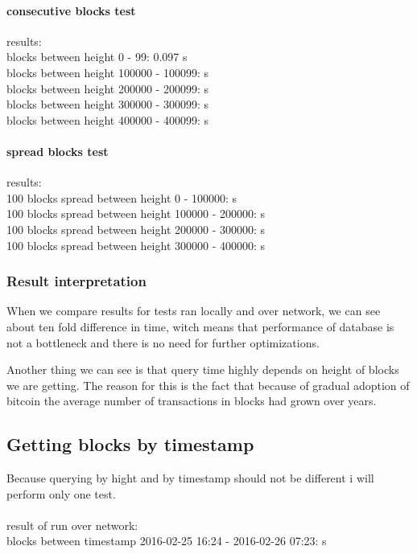 \documentclass[12pt, en, eng]{mgr}
\begin{document}
\paragraph{consecutive blocks test}
results:
\\
blocks between height 0 - 99: \quad \quad \quad \hspace*{2em} 0.097 s\\
blocks between height 100000 - 100099:  s\\
blocks between height 200000 - 200099:  s\\
blocks between height 300000 - 300099:  s\\
blocks between height 400000 - 400099:  s\\

\paragraph{spread blocks test}
results:
\\
100 blocks spread between height 0 - 100000: \quad \quad {} s\\
100 blocks spread between height 100000 - 200000:  s\\
100 blocks spread between height 200000 - 300000:  s\\
100 blocks spread between height 300000 - 400000:  s\\

\subsubsection{Result interpretation}
When we compare results for tests ran locally and over network, we can see about ten fold difference in time, witch means that performance of database is not a bottleneck and there is no need for further optimizations.

Another thing we can see is that query time highly depends on height of blocks we are getting. The reason for this is the fact that because of gradual adoption of bitcoin the average number of transactions in blocks had grown over years. 

\subsection{Getting blocks by timestamp}
Because querying by hight and by timestamp should not be different i will perform only one test.
\\
\\
result of run over network:
\\
blocks between timestamp 2016-02-25 16:24 - 2016-02-26 07:23:  s
\end{document}
